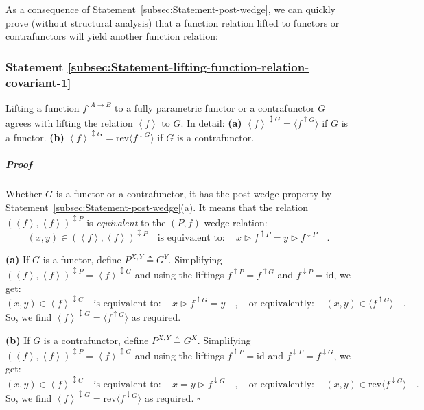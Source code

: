 As a consequence of Statement~\ref{subsec:Statement-post-wedge},
we can quickly prove (without structural analysis) that a function
relation lifted to functors or contrafunctors will yield another function
relation:

\subsubsection{Statement \label{subsec:Statement-lifting-function-relation-covariant-1}\ref{subsec:Statement-lifting-function-relation-covariant-1}}

Lifting a function $f^{:A\rightarrow B}$ to a fully parametric functor
or a contrafunctor $G$ agrees with lifting the relation $\left<f\right>$
to $G$. In detail: \textbf{(a)} $\left<f\right>^{\updownarrow G}=\langle f^{\uparrow G}\rangle$
if $G$ is a functor. \textbf{(b)} $\left<f\right>^{\updownarrow G}=\text{rev}\langle f^{\downarrow G}\rangle$
if $G$ is a contrafunctor.

\subparagraph{Proof}

Whether $G$ is a functor or a contrafunctor, it has the post-wedge
property by Statement~\ref{subsec:Statement-post-wedge}(a). It means
that the relation $(\left<f\right>,\left<f\right>)^{\updownarrow P}$
is \emph{equivalent} to the $\left(P,f\right)$-wedge relation:
\[
(x,y)\in(\left<f\right>,\left<f\right>)^{\updownarrow P}\quad\text{is equivalent to}:\quad x\triangleright f^{\uparrow P}=y\triangleright f^{\downarrow P}\quad.
\]

\textbf{(a)} If $G$ is a functor, define $P^{X,Y}\triangleq G^{Y}$.
Simplifying $(\left<f\right>,\left<f\right>)^{\updownarrow P}=\left<f\right>^{\updownarrow G}$
and using the liftings $f^{\uparrow P}=f^{\uparrow G}$ and $f^{\downarrow P}=\text{id}$,
we get:
\[
(x,y)\in\left<f\right>^{\updownarrow G}\quad\text{is equivalent to}:\quad x\triangleright f^{\uparrow G}=y\quad,\quad\text{or equivalently}:\quad(x,y)\in\langle f^{\uparrow G}\rangle\quad.
\]
So, we find $\left<f\right>^{\updownarrow G}=\langle f^{\uparrow G}\rangle$
as required.

\textbf{(b)} If $G$ is a contrafunctor, define $P^{X,Y}\triangleq G^{X}$.
Simplifying $(\left<f\right>,\left<f\right>)^{\updownarrow P}=\left<f\right>^{\updownarrow G}$
and using the liftings $f^{\uparrow P}=\text{id}$ and $f^{\downarrow P}=f^{\downarrow G}$,
we get:
\[
(x,y)\in\left<f\right>^{\updownarrow G}\quad\text{is equivalent to}:\quad x=y\triangleright f^{\downarrow G}\quad,\quad\text{or equivalently}:\quad(x,y)\in\text{rev}\langle f^{\downarrow G}\rangle\quad.
\]
 So, we find $\left<f\right>^{\updownarrow G}=\text{rev}\langle f^{\downarrow G}\rangle$
as required. $\square$

